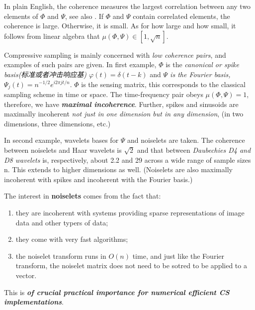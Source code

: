 In plain English, the coherence measures the largest correlation between any two elements of $\Phi$ and $\Psi$, see also \cite{Donoho2001}. If $\Phi$ and $\Psi$ contain correlated elements, the coherence is large. Otherwise, it is small. As for how large and how small, it follows from linear algebra that $\mu(\Phi,\Psi)\in\left[ 1,\sqrt{n} \right]$.

Compressive sampling is mainly concerned with \emph{low coherence pairs}, and examples of such pairs are given. In first example, $\Phi$ is the \emph{canonical or spike basis(标准或者冲击响应基) $\varphi(t)=\delta(t-k)$} and \emph{$\Psi$ is the Fourier basis, \textbf{$\Psi_j(t)=n^{-1/2}e^{i2\pi jt/n}$}}. $\Phi$ is the sensing matrix, this corresponds to the classical sampling scheme in time or space. The time-frequency pair obeys $\mu(\Phi,\Psi)=1$, therefore, we have \textcolor[rgb]{1,0,0}{\textbf{\emph{maximal incoherence}}}. Further, spikes and sinusoids are maximally incoherent \emph{not just in one dimension but in any dimension}, (in two dimensions, three dimensions, etc.)

In second example, wavelets bases for $\Psi$ and noiselets\cite{Coifman2001} are taken. The coherence between noiselets and Haar wavelets is $\sqrt{2}$ and that between \emph{Daubechies D4 and D8 wavelets} is, respectively, about 2.2 and 29 across a wide range of sample sizes n. This extends to higher dimensions as well. (Noiselets are also maximally incoherent with spikes and incoherent with the Fourier basis.)

The interest in \textbf{noiselets} comes from the fact that:
\begin{enumerate}
	\item they are incoherent with systems providing sparse representations of image data and other typers of data;
	\item they come with very fast algorithms;
	\item the noiselet transform runs in $O(n)$ time, and just like the Fourier transform, the noiselet matrix does not need to be sotred to be applied to a vector.
\end{enumerate}
This is \textbf{\textcolor[rgb]{1,0,0}{\emph{of crucial practical importance for numerical efficient CS implementations}}}.

